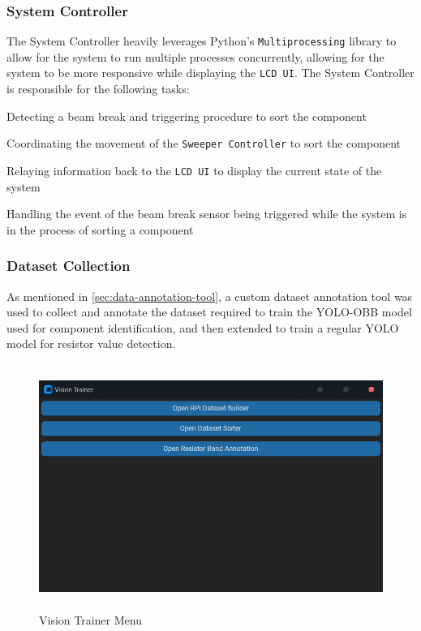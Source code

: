 \subsubsection{System Controller}
\label{sec:system-controller}
The System Controller heavily leverages Python's \texttt{Multiprocessing} library to allow for the system to run multiple processes concurrently, allowing for the system to be more responsive while displaying the \texttt{LCD UI}. The System Controller is responsible for the following tasks:

\begin{mylist}
    \item Detecting a beam break and triggering procedure to sort the component
    \item Coordinating the movement of the \texttt{Sweeper Controller} to sort the component
    \item Relaying information back to the \texttt{LCD UI} to display the current state of the system
    \item Handling the event of the beam break sensor being triggered while the system is in the process of sorting a component
\end{mylist}


\subsubsection{Dataset Collection}
\label{sec:dataset-collection}
As mentioned in \autoref{sec:data-annotation-tool}, a custom dataset annotation tool was used to collect and annotate the dataset required to train the YOLO-OBB model used for component identification, and then extended to train a regular YOLO model for resistor value detection.

\begin{figure}[H]
    \hfill
    \begin{minipage}[t]{\textwidth}
      \centering
      \includegraphics[height=8cm]{imgs/python/visiontrainer.jpg}
      \caption{Vision Trainer Menu}
      \label{fig:vision-trainer}
    \end{minipage}
\end{figure}

